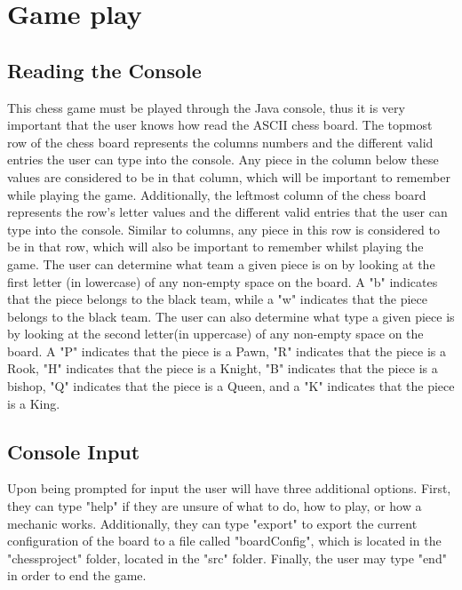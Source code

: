 \documentclass[conference]{IEEEtran}
\begin{document}
\section{Game play}
\subsection{Reading the Console}
This chess game must be played through the Java console, thus it is very important that the user knows how read the ASCII chess board.
The topmost row of the chess board represents the columns numbers and the different valid entries the user can type into the console. Any piece in the column below these values are considered to be in that column, which will be important to remember while playing the game.
Additionally, the leftmost column of the chess board represents the row's letter values and the different valid entries that the user can type into the console. Similar to columns, any piece in this row is considered to be in that row, which will also be important to remember whilst playing the game.
The user can determine what team a given piece is on by looking at the first letter (in lowercase) of any non-empty space on the board. A "b" indicates that the piece belongs to the black team, while a "w" indicates that the piece belongs to the black team.
The user can also determine what type a given piece is by looking at the second letter(in uppercase) of any non-empty space on the board. A "P" indicates that the piece is a Pawn, "R" indicates that the piece is a Rook, "H" indicates that the piece is a Knight, "B" indicates that the piece is a bishop, "Q" indicates that the piece is a Queen, and a "K" indicates that the piece is a King.

\subsection{Console Input}
Upon being prompted for input the user will have three additional options. First, they can type "help" if they are unsure of what to do, how to play, or how a mechanic works. Additionally, they can type "export" to export the current configuration of the board to a file called "boardConfig", which is located in the "chessproject" folder, located in the "src" folder. Finally, the user may type "end" in order to end the game.
\end{document}

